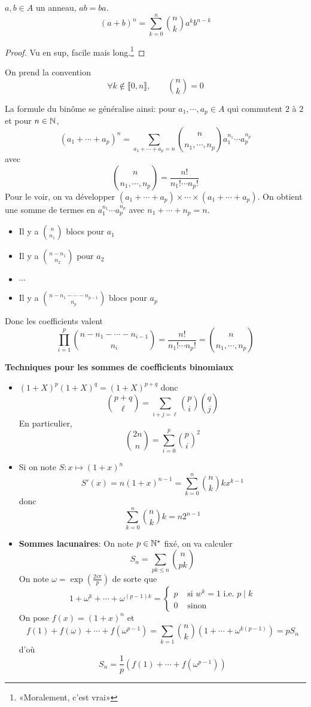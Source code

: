 \begin{prop}
    \Hyp $a, b\in A$ un anneau, $ab=ba$.
    \Conc {}\[
        (a+b)^n=\sum_{k=0}^n\binom nk a^kb^{n-k}
    \]
\end{prop}

\begin{proof}
    Vu en sup, facile mais long.\footnote{«Moralement, c'est vrai»}
\end{proof}

\begin{rem}
    On prend la convention \[
        \forall k\not\in\llbracket 0, n\rrbracket, \qquad \binom nk=0
    \]
\end{rem}

La formule du binôme se généralise ainsi: pour $a_1, \cdots, a_p\in A$ qui commutent $2$ à $2$ et pour $n\in\mathbb N$, \[
    (a_1+\cdots +a_p)^n=\sum_{a_1+\cdots +a_p=n}\binom{n}{n_1, \cdots, n_p}a_1^{n_1}\cdots a_p^{n_p}
\]
avec \[
    \binom{n}{n_1, \cdots, n_p}=\frac{n!}{n_1!\cdots n_p!}
\]
Pour le voir, on va développer $(a_1+\cdots +a_p)\times\cdots\times(a_1+\cdots +a_p)$. On obtient une somme de termes en $a_1^{n_1}\cdots a_p^{n_p}$ avec $n_1+\cdots +n_p=n$. \begin{itemize}
    \item Il y a $\binom n{n_1}$ blocs pour $a_1$
    \item Il y a $\binom{n-n_1}{n_2}$ pour $a_2$
    \item $\cdots$
    \item Il y a $\binom{n-n_1-\cdots -n_{p-1}}{n_p}$ blocs pour $a_p$
\end{itemize}

Donc les coefficients valent \[
    \prod_{i=1}^p\binom{n-n_1-\cdots -n_{i-1}}{n_i}=\frac{n!}{n_1!\cdots n_p!}=\binom n{n_1,\cdots, n_p}
\]

\textbf{Techniques pour les sommes de coefficients binomiaux}
\begin{itemize}
    \item $(1+X)^p(1+X)^q=(1+X)^{p+q}$ donc \[
    \binom{p+q}\ell=\sum_{i+j=\ell}\binom pi\binom qj
\]
En particulier, \[
    \binom {2n}n=\sum_{i=0}^p\binom pi^2
\]
\item Si on note $S:x\longmapsto (1+x)^n$ \[
        S'(x)=n(1+x)^{n-1}=\sum_{k=0}^n\binom nk kx^{k-1}
    \]
    donc \[
        \sum_{k=0}^n\binom nkk=n2^{n-1}
    \]
\item \textbf{Sommes lacunaires}: On note $p\in\mathbb N^\star$ fixé, on va calculer \[
        S_n=\sum_{pk\leq n}\binom n{pk}
    \]
    On note $\omega=\exp \left(  \frac{2i\pi}p\right)$ de sorte que \[
        1+\omega^k+\cdots +\omega^{(p-1)k}= \begin{cases}
            p&\text{ si } w^k=1 \text{ i.e. } p\;|\; k \\ 0 &\text{ sinon }
        \end{cases}
    \]
    On pose $f(x)=(1+x)^n$ et \[
        f(1)+f(\omega)+\cdots +f(\omega^{p-1})=\sum_{k=1}\binom nk(1+\cdots +\omega^{k(p-1)})=pS_n
    \]
    d'où \[
        S_n=\frac1p \left( f(1)+\cdots +f(\omega^{p-1}) \right)
    \]
\end{itemize}

